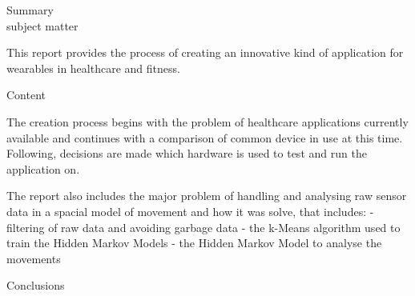 \hfill{\Huge Summary}\\

subject matter

This report provides the process of creating an innovative kind of application for wearables in healthcare and fitness.

Content

The creation process begins with the problem of healthcare applications currently available and continues with a comparison of common device in use at this time. Following, decisions are made which hardware is used to test and run the application on.

The report also includes the major problem of handling and analysing raw sensor data in a spacial model of movement and how it was solve, that includes:
- filtering of raw data and avoiding garbage data
- the k-Means algorithm used to train the Hidden Markov Models
- the Hidden Markov Model to analyse the movements



Conclusions